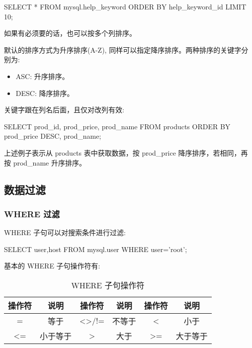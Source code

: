 \begin{sql}
SELECT * FROM mysql.help_keyword ORDER BY help_keyword_id LIMIT 10;
\end{sql}

如果有必须要的话，也可以按多个列排序。


默认的排序方式为升序排序(A-Z), 同样可以指定降序排序。两种排序的关键字分别为:
\begin{itemize}
    \item ASC: 升序排序。
    \item DESC: 降序排序。
\end{itemize}

关键字跟在列名后面，且仅对改列有效:

\begin{sql}
SELECT prod_id, prod_price, prod_name
    FROM products
    ORDER BY prod_price DESC, prod_name;
\end{sql}

上述例子表示从 products 表中获取数据，按 prod\_price 降序排序，若相同，再按 prod\_name 升序排序。

\subsection{数据过滤}

\subsubsection{WHERE 过滤}

WHERE 子句可以对搜索条件进行过滤:

\begin{sql}
SELECT user,host FROM mysql.user WHERE user='root';
\end{sql}

基本的 WHERE 子句操作符有:

\begin{table}[H]
    \centering
    \caption{WHERE 子句操作符}
    \label{table:WHERE 子句操作符}
    \setlength{\tabcolsep}{4mm}
    \begin{tabular}{cc|cc|cc}
        \toprule
        \textbf{操作符} & \textbf{说明} & \textbf{操作符} & \textbf{说明} &\textbf{操作符} & \textbf{说明} \\
        \midrule
        = & 等于 & <>/!= & 不等于 & < & 小于 \\
        <= & 小于等于 & > & 大于 & >= & 大于等于 \\
        \bottomrule
    \end{tabular}
\end{table}

